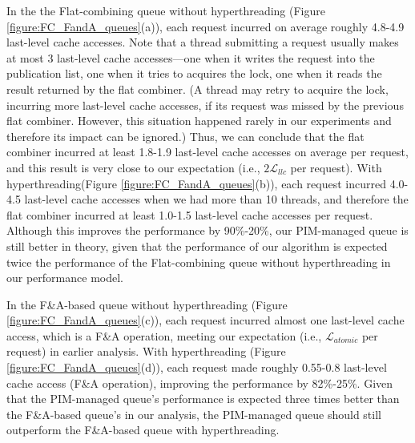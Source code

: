 \documentclass[11pt]{article}
\newcommand{\latllc} {\mathcal{L}_{llc}}
\newcommand{\latato} {\mathcal{L}_{atomic}}
\begin{document}
In the the Flat-combining queue without hyperthreading (Figure \ref{figure:FC_FandA_queues}(a)), 
each request incurred on average roughly 4.8-4.9 last-level cache accesses. 
Note that a thread submitting a request usually makes at most 3 last-level cache accesses---one 
when it writes the request into the publication list, one when it tries to acquires the lock, 
one when it reads the result returned by the flat combiner. 
(A thread may retry to acquire the lock, incurring more last-level cache accesses, 
if its request was missed by the previous flat combiner. 
However, this situation happened rarely in our experiments and therefore its impact can be ignored.) 
Thus, we can conclude that the flat combiner incurred at least 1.8-1.9 last-level cache accesses 
on average per request, and this result is very close to our expectation (i.e., $2\latllc$ per request). 
With hyperthreading(Figure \ref{figure:FC_FandA_queues}(b)), 
each request incurred 4.0-4.5 last-level cache accesses when we had more than 10 threads, 
and therefore the flat combiner incurred at least 1.0-1.5 last-level cache accesses per request. 
Although this improves the performance by 90\%-20\%, our PIM-managed queue is still better in theory, 
given that the performance of our algorithm is expected twice the performance of the Flat-combining queue 
without hyperthreading in our performance model. 

In the F\&A-based queue without hyperthreading (Figure \ref{figure:FC_FandA_queues}(c)), 
each request incurred almost one last-level cache access, which is a F\&A operation, 
meeting our expectation (i.e., $\latato$ per request) in earlier analysis. 
With hyperthreading (Figure \ref{figure:FC_FandA_queues}(d)), each request made roughly 0.55-0.8 
last-level cache access (F\&A operation), improving the performance by 82\%-25\%.
Given that the PIM-managed queue's performance is expected three times better than the F\&A-based queue's 
in our analysis, the PIM-managed queue should still outperform the F\&A-based queue with hyperthreading. 
\end{document}
